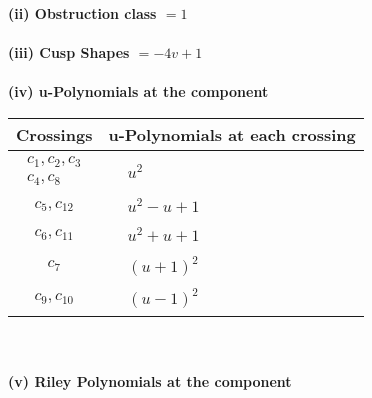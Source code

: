 \documentclass[1p]{elsarticle_modified}
\theoremstyle{definition}
\begin{document}
\flushleft \textbf{(ii) Obstruction class $= 1$}\\~\\
\flushleft \textbf{(iii) Cusp Shapes $= -4 v+1$}\\~\\
\newpage\renewcommand{\arraystretch}{1}
\flushleft \textbf{(iv) u-Polynomials at the component}\newline \\
\begin{tabular}{m{50pt}|m{274pt}}
Crossings & \hspace{64pt}u-Polynomials at each crossing \\
\hline $$\begin{aligned}c_{1},c_{2},c_{3}\\c_{4},c_{8}\end{aligned}$$&$\begin{aligned}
&u^2
\end{aligned}$\\
\hline $$\begin{aligned}c_{5},c_{12}\end{aligned}$$&$\begin{aligned}
&u^2- u+1
\end{aligned}$\\
\hline $$\begin{aligned}c_{6},c_{11}\end{aligned}$$&$\begin{aligned}
&u^2+u+1
\end{aligned}$\\
\hline $$\begin{aligned}c_{7}\end{aligned}$$&$\begin{aligned}
&(u+1)^2
\end{aligned}$\\
\hline $$\begin{aligned}c_{9},c_{10}\end{aligned}$$&$\begin{aligned}
&(u-1)^2
\end{aligned}$\\
\hline
\end{tabular}\\~\\
\newpage\renewcommand{\arraystretch}{1}
\flushleft \textbf{(v) Riley Polynomials at the component}\newline \\
\end{document}
